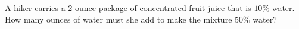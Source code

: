 A hiker carries a $2$-ounce package of concentrated fruit juice that is $10\%$ water. How many ounces of water must she add to make the mixture $50\%$ water?
